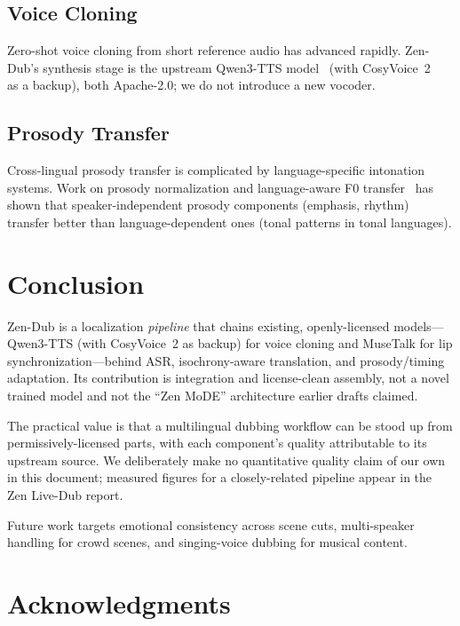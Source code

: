 \documentclass[11pt,a4paper]{article}
\begin{document}
\subsection{Voice Cloning}

Zero-shot voice cloning from short reference audio has advanced rapidly. Zen-Dub's
synthesis stage is the upstream Qwen3-TTS model~\cite{qwen3tts} (with CosyVoice~2
~\cite{cosyvoice2} as a backup), both Apache-2.0; we do not introduce a new vocoder.

\subsection{Prosody Transfer}

Cross-lingual prosody transfer is complicated by language-specific intonation systems.
Work on prosody normalization and language-aware F0 transfer~\cite{prosody} has shown
that speaker-independent prosody components (emphasis, rhythm) transfer better than
language-dependent ones (tonal patterns in tonal languages).

\section{Conclusion}
\label{sec:conclusion}

Zen-Dub is a localization \emph{pipeline} that chains existing, openly-licensed
models---Qwen3-TTS (with CosyVoice~2 as backup) for voice cloning and MuseTalk for lip
synchronization---behind ASR, isochrony-aware translation, and prosody/timing
adaptation. Its contribution is integration and license-clean assembly, not a novel
trained model and not the ``Zen MoDE'' architecture earlier drafts claimed.

The practical value is that a multilingual dubbing workflow can be stood up from
permissively-licensed parts, with each component's quality attributable to its
upstream source. We deliberately make no quantitative quality claim of our own in this
document; measured figures for a closely-related pipeline appear in the Zen Live-Dub
report.

Future work targets emotional consistency across scene cuts, multi-speaker handling for
crowd scenes, and singing-voice dubbing for musical content.

\section*{Acknowledgments}
\end{document}
